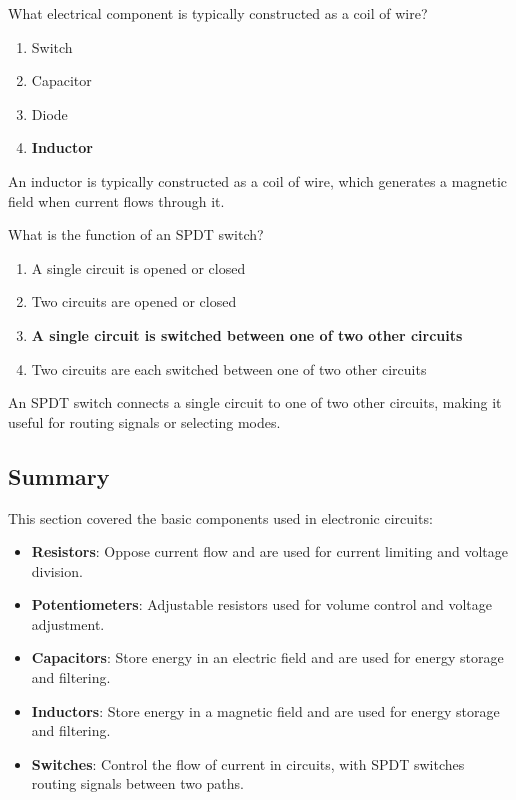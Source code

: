 
\begin{tcolorbox}[colback=gray!10!white,colframe=black!75!black,title={T6A07}]
    What electrical component is typically constructed as a coil of wire?
    \begin{enumerate}[label=\Alph*),noitemsep]
        \item Switch
        \item Capacitor
        \item Diode
        \item \textbf{Inductor}
    \end{enumerate}
\end{tcolorbox}
An inductor is typically constructed as a coil of wire, which generates a magnetic field when current flows through it.


\begin{tcolorbox}[colback=gray!10!white,colframe=black!75!black,title={T6A08}]
    What is the function of an SPDT switch?
    \begin{enumerate}[label=\Alph*),noitemsep]
        \item A single circuit is opened or closed
        \item Two circuits are opened or closed
        \item \textbf{A single circuit is switched between one of two other circuits}
        \item Two circuits are each switched between one of two other circuits
    \end{enumerate}
\end{tcolorbox}
An SPDT switch connects a single circuit to one of two other circuits, making it useful for routing signals or selecting modes.


\subsection*{Summary}
This section covered the basic components used in electronic circuits:
\begin{itemize}
    \item \textbf{Resistors}: Oppose current flow and are used for current limiting and voltage division.
    \item \textbf{Potentiometers}: Adjustable resistors used for volume control and voltage adjustment.
    \item \textbf{Capacitors}: Store energy in an electric field and are used for energy storage and filtering.
    \item \textbf{Inductors}: Store energy in a magnetic field and are used for energy storage and filtering.
    \item \textbf{Switches}: Control the flow of current in circuits, with SPDT switches routing signals between two paths.
\end{itemize}
